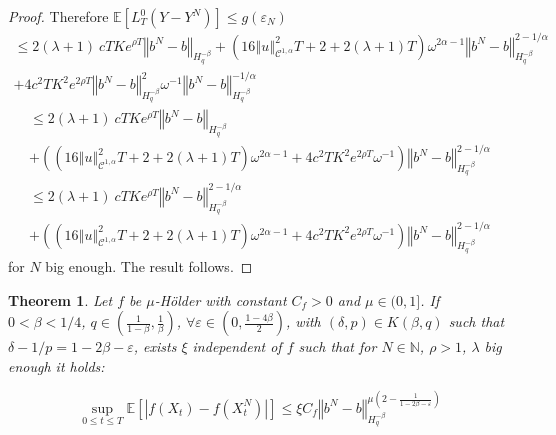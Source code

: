 \documentclass[12pt]{article}
\newtheorem{theo}{Theorem}
\newcommand{\norme}[1]{\left\Vert #1\right\Vert}
\newcommand{\N}{\mathbb{N}}
\newcommand{\E}{\mathbb{E}}
\begin{document}
\begin{proof}
    Therefore $
    \E\left[L^0_T(Y-Y^N)\right]\leq g(\varepsilon_N)
    $
    \begin{multline*}
    \leq 2(\lambda + 1)\ cT Ke^{\rho T}\norme{b^N-b}_{H^{-\beta}_{q}} +\left(16\norme{u}_{\mathcal{C}^{1,\alpha}}^2 T + 2 + 2(\lambda + 1)T\right) \omega^{2\alpha-1} \norme{b^N-b}_{H^{-\beta}_{q}}^{2-1/\alpha}\\+ 4c^2T K^2e^{2\rho T}\norme{b^N-b}_{H^{-\beta}_{q}}^2\omega^{-1}\norme{b^N-b}_{H^{-\beta}_{q}}^{-1/\alpha}
    \end{multline*}    
    \begin{multline*}
    \leq 2(\lambda + 1)\ cT Ke^{\rho T}\norme{b^N-b}_{H^{-\beta}_{q}} \\+\left(\left(16\norme{u}_{\mathcal{C}^{1,\alpha}}^2 T + 2 + 2(\lambda + 1)T\right) \omega^{2\alpha-1} + 4c^2T K^2e^{2\rho T}\omega^{-1}\right)\norme{b^N-b}_{H^{-\beta}_{q}}^{2-1/\alpha}
    \end{multline*}    
    \begin{multline*}
    \leq 2(\lambda + 1)\ cT Ke^{\rho T}\norme{b^N-b}_{H^{-\beta}_{q}}^{2-1/\alpha} \\+\left(\left(16\norme{u}_{\mathcal{C}^{1,\alpha}}^2 T + 2 + 2(\lambda + 1)T\right) \omega^{2\alpha-1} + 4c^2T K^2e^{2\rho T}\omega^{-1}\right)\norme{b^N-b}_{H^{-\beta}_{q}}^{2-1/\alpha}
    \end{multline*}
    for $N$ big enough. The result follows.
\end{proof}

\begin{theo}
    Let $f$ be $\mu$-Hölder with constant $C_f>0$ and $\mu\in(0,1]$. If $0<\beta < 1/4$, $q\in\left(\frac{1}{1-\beta},\frac{1}{\beta}\right)$, $\forall \varepsilon \in(0,\frac{1-4\beta}{2})$, with  $(\delta,p)\in K(\beta,q)$ such that $\delta - 1/p = 1-2\beta - \varepsilon$, exists $\xi$ independent of $f$ such that for $N\in\N$, $\rho>1$, $\lambda$ big enough it holds:
    
    \begin{equation*}
    \underset{0\leq t\leq T} {\sup}\E\left[\left|f\left(X_t\right)-f\left(X_t^N\right)\right|\right] \leq \xi C_f \norme{b^N-b}_{H^{-\beta}_{q}}^{\mu\left(2-\frac{1}{1-2\beta-\varepsilon}\right)}
    \end{equation*}
\end{theo}
\end{document}
